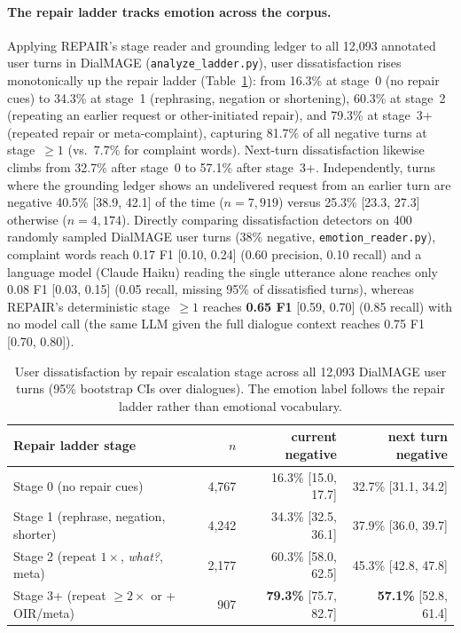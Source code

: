 \documentclass[11pt]{article}
\begin{document}
\paragraph{The repair ladder tracks emotion across the corpus.} Applying REPAIR's stage reader and grounding
ledger to all 12,093 annotated user turns in DialMAGE (\texttt{analyze\allowbreak\_ladder.py}), user dissatisfaction
rises monotonically up the repair ladder (Table~\ref{tab:ladder}): from 16.3\% at stage~0 (no repair cues) to
34.3\% at stage~1 (rephrasing, negation or shortening), 60.3\% at stage~2 (repeating an earlier request or
other-initiated repair), and 79.3\% at stage~3+ (repeated repair or meta-complaint), capturing 81.7\% of all
negative turns at stage~$\ge 1$ (vs.\ 7.7\% for complaint words). Next-turn dissatisfaction likewise climbs
from 32.7\% after stage~0 to 57.1\% after stage~3+. Independently, turns where the grounding ledger shows an
undelivered request from an earlier turn are negative 40.5\% [38.9, 42.1] of the time ($n=7{,}919$) versus
25.3\% [23.3, 27.3] otherwise ($n=4{,}174$). Directly comparing dissatisfaction detectors on 400 randomly
sampled DialMAGE user turns (38\% negative, \texttt{emotion\_reader.py}), complaint words reach 0.17 F1
[0.10, 0.24] (0.60 precision, 0.10 recall) and a language model (Claude Haiku) reading the single utterance
alone reaches only 0.08 F1 [0.03, 0.15] (0.05 recall, missing 95\% of dissatisfied turns), whereas REPAIR's
deterministic stage~$\ge 1$ reaches \textbf{0.65 F1} [0.59, 0.70] (0.85 recall) with no model call (the same
LLM given the full dialogue context reaches 0.75 F1 [0.70, 0.80]).

\begin{table}[h]
\centering
\begin{tabular}{lrrr}
\toprule
Repair ladder stage & $n$ & current negative & next turn negative \\
\midrule
Stage 0 (no repair cues) & 4,767 & 16.3\% [15.0, 17.7] & 32.7\% [31.1, 34.2] \\
Stage 1 (rephrase, negation, shorter) & 4,242 & 34.3\% [32.5, 36.1] & 37.9\% [36.0, 39.7] \\
Stage 2 (repeat $1\times$, \emph{what?}, meta) & 2,177 & 60.3\% [58.0, 62.5] & 45.3\% [42.8, 47.8] \\
Stage 3+ (repeat $\ge 2\times$ or + OIR/meta) & 907 & \textbf{79.3\%} [75.7, 82.7] & \textbf{57.1\%} [52.8, 61.4] \\
\bottomrule
\end{tabular}
\caption{User dissatisfaction by repair escalation stage across all 12,093 DialMAGE user turns (95\% bootstrap
CIs over dialogues). The emotion label follows the repair ladder rather than emotional vocabulary.}
\label{tab:ladder}
\end{table}
\end{document}
